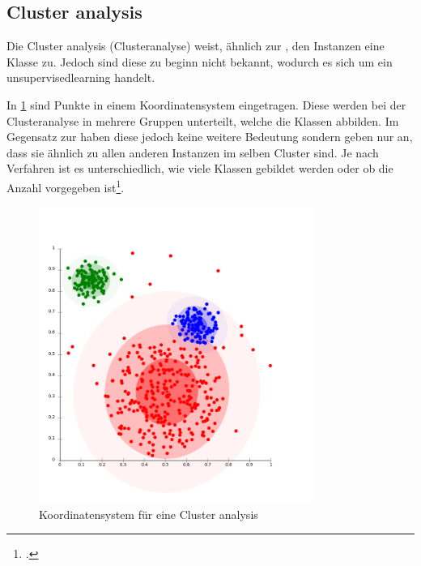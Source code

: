 \subsection{Cluster analysis}
\label{sec:recherche:dataminingtechniken:disziplinen:clusteranalysis}
Die Cluster analysis (Clusteranalyse) weist, ähnlich zur , den Instanzen eine Klasse zu. Jedoch sind diese zu beginn nicht bekannt, wodurch es sich um ein \gls{unsupervisedlearning} handelt.

In \cref{fig:recherche:dataminingtechniken:disziplinen:clusteranalysis} sind Punkte in einem Koordinatensystem eingetragen. Diese werden bei der Clusteranalyse in mehrere Gruppen unterteilt, welche die Klassen abbilden. Im Gegensatz zur  haben diese jedoch keine weitere Bedeutung sondern geben nur an, dass sie ähnlich zu allen anderen Instanzen im selben Cluster sind. Je nach Verfahren ist es unterschiedlich, wie viele Klassen gebildet werden oder ob die Anzahl vorgegeben ist\footcite{data_mining_concepts_and_techniques}.
\begin{figure}[H]
	\RawFloats
	\centering
	\includegraphics[width=0.8\textwidth]{images/clusteranalysis.png}
	\caption{Koordinatensystem für eine Cluster analysis}
	\label{fig:recherche:dataminingtechniken:disziplinen:clusteranalysis}
\end{figure}

